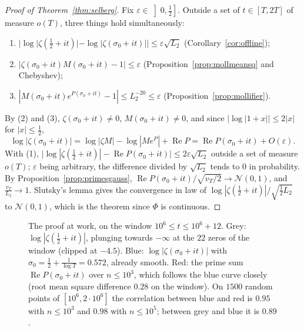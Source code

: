 \begin{proof}[Proof of Theorem~\ref{thm:selberg}]
Fix $\varepsilon\in\left]0,\frac12\right]$. Outside a set of $t\in[T,2T]$ of measure $o(T)$, three things hold simultaneously:
\begin{enumerate}
\item $|\log|\zeta(\frac12+it)|-\log|\zeta(\sigma_0+it)||\le\varepsilon\sqrt{L_2}$ (Corollary~\ref{cor:offline});
\item $|\zeta(\sigma_0+it)M(\sigma_0+it)-1|\le\varepsilon$ (Proposition~\ref{prop:mollmeansq} and Chebyshev);
\item $|M(\sigma_0+it)e^{P(\sigma_0+it)}-1|\le L_2^{-20}\le\varepsilon$ (Proposition~\ref{prop:mollifier}).
\end{enumerate}
By (2) and (3), $\zeta(\sigma_0+it)\ne0$, $M(\sigma_0+it)\ne0$, and since $|\log|1+x||\le2|x|$ for $|x|\le\frac12$,
\[
\log|\zeta(\sigma_0+it)|=\log|\zeta M|-\log|Me^P|+\operatorname{Re}P=\operatorname{Re}P(\sigma_0+it)+O(\varepsilon).
\]
With (1), $\bigl|\log|\zeta(\frac12+it)|-\operatorname{Re}P(\sigma_0+it)\bigr|\le2\varepsilon\sqrt{L_2}$ outside a set of measure $o(T)$; $\varepsilon$ being arbitrary, the difference divided by $\sqrt{L_2}$ tends to $0$ in probability. By Proposition~\ref{prop:primesgauss}, $\operatorname{Re}P(\sigma_0+it)/\sqrt{v_T/2}\to\mathcal N(0,1)$, and $\frac{v_T}{L_2}\to1$. Slutsky's lemma gives the convergence in law of $\log|\zeta(\frac12+it)|/\sqrt{\frac12L_2}$ to $\mathcal N(0,1)$, which is the theorem since $\Phi$ is continuous.
\end{proof}

\begin{figure}[ht]
\centering{}
\caption{The proof at work, on the window $10^6\le t\le10^6+12$. Grey: $\log|\zeta(\frac12+it)|$, plunging towards $-\infty$ at the $22$ zeros of the window (clipped at $-4.5$). Blue: $\log|\zeta(\sigma_0+it)|$ with $\sigma_0=\frac12+\frac1{\log T}=0.572$, already smooth. Red: the prime sum $\operatorname{Re}P(\sigma_0+it)$ over $n\le10^3$, which follows the blue curve closely (root mean square difference $0.28$ on the window). On $1500$ random points of $[10^6,2\cdot10^6]$ the correlation between blue and red is $0.95$ with $n\le10^3$ and $0.98$ with $n\le10^5$; between grey and blue it is $0.89$.}
\label{fig:selbergwindow}
\end{figure}

